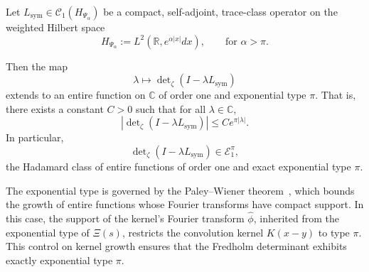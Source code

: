 \begin{lemma}
\label{lem:det_identity_entire_order_one}

Let \( L_{\mathrm{sym}} \in \mathcal{C}_1(H_{\Psi_\alpha}) \) be a compact, self-adjoint, trace-class operator on the weighted Hilbert space
\[
H_{\Psi_\alpha} := L^2(\mathbb{R}, e^{\alpha |x|} dx), \qquad \text{for } \alpha > \pi.
\]

Then the map
\[
\lambda \mapsto \det\nolimits_\zeta(I - \lambda L_{\mathrm{sym}})
\]
extends to an entire function on \( \mathbb{C} \) of order one and exponential type \( \pi \). That is, there exists a constant \( C > 0 \) such that for all \( \lambda \in \mathbb{C} \),
\[
\left| \det\nolimits_\zeta(I - \lambda L_{\mathrm{sym}}) \right| \le C e^{\pi |\lambda|}.
\]
In particular,
\[
\det\nolimits_\zeta(I - \lambda L_{\mathrm{sym}}) \in \mathcal{E}_1^\pi,
\]
the Hadamard class of entire functions of order one and exact exponential type \( \pi \).

\medskip
\noindent
The exponential type is governed by the Paley--Wiener theorem~\cite[Ch.~9]{Levin1996EntireLectures}, which bounds the growth of entire functions whose Fourier transforms have compact support. In this case, the support of the kernel’s Fourier transform \( \widehat{\phi} \), inherited from the exponential type of \( \Xi(s) \), restricts the convolution kernel \( K(x - y) \) to type \( \pi \). This control on kernel growth ensures that the Fredholm determinant exhibits exactly exponential type \( \pi \).
\end{lemma}
